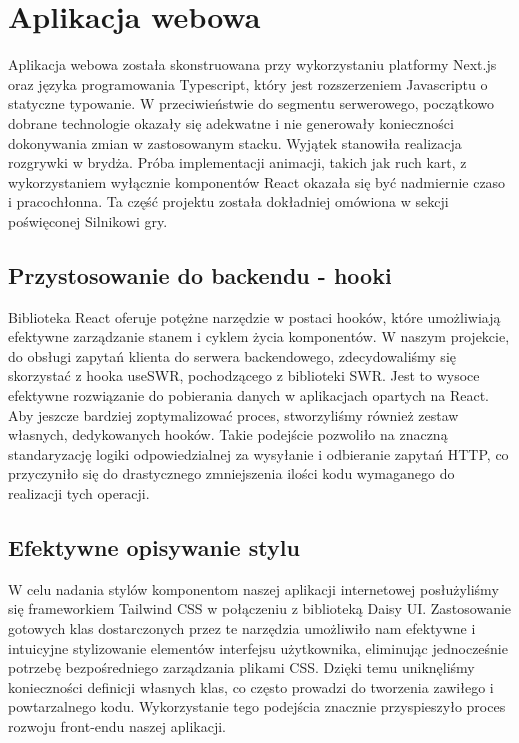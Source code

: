 
\section{Aplikacja webowa}
Aplikacja webowa została skonstruowana przy wykorzystaniu platformy Next.js oraz języka programowania Typescript, który jest rozszerzeniem Javascriptu o statyczne typowanie. W przeciwieństwie do segmentu serwerowego, początkowo dobrane technologie okazały się adekwatne i nie generowały konieczności dokonywania zmian w zastosowanym stacku. Wyjątek stanowiła realizacja rozgrywki w brydża. Próba implementacji animacji, takich jak ruch kart, z wykorzystaniem wyłącznie komponentów React okazała się być nadmiernie czaso i pracochłonna. Ta część projektu została dokładniej omówiona w sekcji poświęconej Silnikowi gry.

\subsection{Przystosowanie do backendu - hooki}
Biblioteka React oferuje potężne narzędzie w postaci hooków, które umożliwiają efektywne zarządzanie stanem i cyklem życia komponentów. W naszym projekcie, do obsługi zapytań klienta do serwera backendowego, zdecydowaliśmy się skorzystać z hooka useSWR, pochodzącego z biblioteki SWR. Jest to wysoce efektywne rozwiązanie do pobierania danych w aplikacjach opartych na React. Aby jeszcze bardziej zoptymalizować proces, stworzyliśmy również zestaw własnych, dedykowanych hooków. Takie podejście pozwoliło na znaczną standaryzację logiki odpowiedzialnej za wysyłanie i odbieranie zapytań HTTP, co przyczyniło się do drastycznego zmniejszenia ilości kodu wymaganego do realizacji tych operacji.
\subsection{Efektywne opisywanie stylu}
W celu nadania stylów komponentom naszej aplikacji internetowej posłużyliśmy się frameworkiem Tailwind CSS w połączeniu z biblioteką Daisy UI. Zastosowanie gotowych klas dostarczonych przez te narzędzia umożliwiło nam efektywne i intuicyjne stylizowanie elementów interfejsu użytkownika, eliminując jednocześnie potrzebę bezpośredniego zarządzania plikami CSS. Dzięki temu uniknęliśmy konieczności definicji własnych klas, co często prowadzi do tworzenia zawiłego i powtarzalnego kodu. Wykorzystanie tego podejścia znacznie przyspieszyło proces rozwoju front-endu naszej aplikacji.
